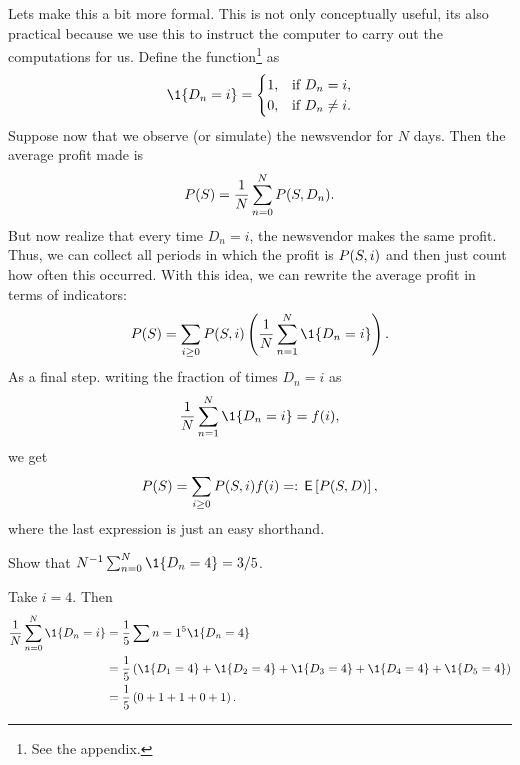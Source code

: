 Lets make this a bit more formal. This is not only conceptually useful, its also practical because we use this to instruct  the computer to carry out the computations for us. Define the  function\footnote{See the appendix.}
as \begin{equation*}
\1{D_n=i} = 
  \begin{cases}
    1, &\text{if } D_n=i, \\
    0, &\text{if } D_n\neq i.
  \end{cases}
\end{equation*}
Suppose now that we observe (or simulate) the newsvendor for $N$ days. Then the average profit made is
\begin{equation*}
P(S) = \frac 1 N \sum_{n=0}^{N} P(S, D_n).
\end{equation*}
But now realize that every time $D_n=i$, the newsvendor makes the same profit. Thus, we can collect all periods in which the profit is $P(S, i)$ and then just count how often this occurred. With this idea, we can rewrite the average profit in terms of indicators: 
\begin{equation*}
P(\Q) = \sum_{i\geq 0} P(S, i)\left( \frac 1 N \sum_{n=1}^{N} \1{D_n=i}\right).
\end{equation*}
As a final step. writing the fraction of times $D_n=i$ as 
\begin{equation*}
 \frac 1 N \sum_{n=1}^{N} \1{D_n=i} = f(i),
\end{equation*}
we get
\begin{equation}\label{eq:29}
P(S) = \sum_{i\geq 0} P(S, i) f(i) =: \,\mathsf{E}\left[P(S, D)\right],
\end{equation}
where the last expression is just an easy shorthand. 


\begin{exercise} Show that $N^{-1} \sum_{n=0}^{N} \1{D_n=4}=3/5$. 
  \begin{solution}
Take $i=4$. Then
\begin{align*}
\frac 1 N \sum_{n=0}^{N} \1{D_n=i} 
&= \frac 1 5 \sum{n=1}^5 \1{D_n=4} \\
&=\frac 1 5 \left(\1{D_1=4} + \1{D_2=4} + \1{D_3=4} + \1{D_4=4} + \1{D_5=4} \right)\\
&=\frac 1 5 \left(0 + 1 + 1 + 0 + 1 \right).
\end{align*}
  \end{solution}
\end{exercise}



